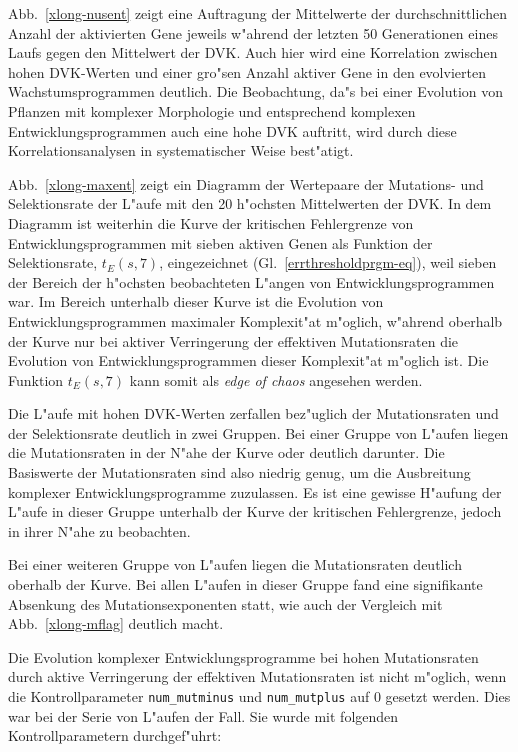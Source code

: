 Abb.\ \ref{xlong-nusent} zeigt eine Auftragung der Mittelwerte der durchschnittlichen Anzahl der aktivierten
Gene jeweils w"ahrend der letzten 50 Generationen eines Laufs gegen den Mittelwert der DVK. Auch hier wird
eine Korrelation zwischen hohen DVK-Werten und einer gro"sen Anzahl aktiver Gene in den evolvierten Wachstumsprogrammen
deutlich. Die Beobachtung, da"s bei einer Evolution von Pflanzen mit komplexer Morphologie und entsprechend
komplexen Entwicklungsprogrammen auch eine hohe DVK auftritt, wird durch diese Korrelationsanalysen in systematischer
Weise best"atigt.

Abb.\ \ref{xlong-maxent} zeigt ein Diagramm der Wertepaare der Mutations- und Selektionsrate
der L"aufe mit den 20 h"ochsten Mittelwerten der DVK. In dem Diagramm ist weiterhin die Kurve der kritischen
Fehlergrenze von Entwicklungsprogrammen mit sieben aktiven Genen als Funktion der Selektionsrate, $t_E(s,7)$, eingezeichnet
(Gl.\ \ref{errthresholdprgm-eq}), weil sieben der Bereich der h"ochsten beobachteten L"angen von Entwicklungsprogrammen
war. Im Bereich unterhalb dieser Kurve ist die Evolution von Entwicklungsprogrammen maximaler Komplexit"at m"oglich,
w"ahrend oberhalb der Kurve nur bei aktiver Verringerung der effektiven Mutationsraten die Evolution von Entwicklungsprogrammen
dieser Komplexit"at m"oglich ist. Die Funktion $t_E(s,7)$ kann somit als \textsl{edge of chaos} \cite{Gutowitz95,Kauffman92,Langton92}
angesehen werden.

Die L"aufe mit hohen DVK-Werten zerfallen bez"uglich der Mutationsraten
und der Selektionsrate deutlich in zwei Gruppen. Bei einer Gruppe von L"aufen liegen die Mutationsraten
in der N"ahe der Kurve oder deutlich darunter. Die Basiswerte der Mutationsraten sind also niedrig genug,
um die Ausbreitung komplexer Entwicklungsprogramme zuzulassen. Es ist eine gewisse H"aufung der L"aufe in
dieser Gruppe unterhalb der Kurve der kritischen Fehlergrenze, jedoch in ihrer N"ahe zu beobachten.

Bei einer weiteren Gruppe von L"aufen liegen die
Mutationsraten deutlich oberhalb der Kurve. Bei allen
L"aufen in dieser Gruppe fand eine signifikante Absenkung des Mutationsexponenten statt, wie auch der
Vergleich mit Abb.\ \ref{xlong-mflag} deutlich macht. 

Die Evolution komplexer Entwicklungsprogramme bei hohen Mutationsraten durch aktive Verringerung der effektiven
Mutationsraten ist nicht m"oglich, wenn die Kontrollparameter \verb|num_mutminus| und \verb|num_mutplus| auf
0 gesetzt werden. Dies war bei der Serie von L"aufen  der Fall. Sie wurde mit folgenden
Kontrollparametern durchgef"uhrt:

